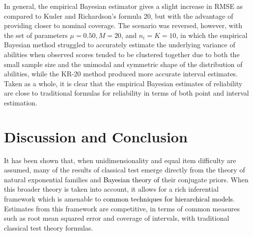 \documentclass[12pt,epsfig]{article}
\newcommand{\change}[1]{\textcolor{black}{#1}}
\begin{document}
In general, the empirical Bayesian estimator gives a slight increase in RMSE as compared to Kuder and Richardson's formula 20, but with the advantage of providing closer to nominal coverage. The scenario was reversed, however, with the set of parameters $\mu = 0.50, M = 20$, and $n_i = K = 10$, in which the empirical Bayesian method struggled to accurately estimate the underlying variance of abilities when observed scores tended to be clustered together due to both the small sample size and the unimodal and symmetric shape of the distribution of abilities, while the KR-20 method produced more accurate interval estimates. Taken as a whole, it is clear that the empirical Bayesian estimates of reliability are close to traditional formulas for reliability in terms of both point and interval estimation.






\section{Discussion and Conclusion}


It has been shown that, when unidimensionality and equal item difficulty are assumed, many of the results of classical test emerge directly from the theory of natural exponential families and \change{Bayesian theory of} their conjugate priors. When this broader theory is taken into account, it allows for a rich inferential framework which is amenable to \change{common techniques for hierarchical models}. Estimates from this framework are competitive, in terms of common measures such as root mean squared error and coverage of intervals, with traditional classical test theory formulas.
\end{document}
